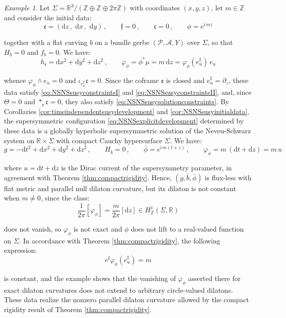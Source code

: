\documentclass[10pt,reqno,a4paper]{amsart}
\theoremstyle{plain}
\theoremstyle{definition}
\theoremstyle{remark}
\theoremstyle{remark}
\newtheorem{ep}[thm]{Example}
\def\dd{\mathrm{d}}
\def\cA{\mathcal{A}}
\def\cP{\mathcal{P}}
\def\frc{\mathfrak{c}}
\def\fre{\mathfrak{e}}
\renewcommand{\(}{ (}
\renewcommand{\)}{ )}
\newcommand{\frf}{\mathfrak{f}}
\begin{document}
\begin{ep}
\label{ep:compactnontrivialdilaton}
Let $\Sigma = \mathbb{R}^3/(\mathbb{Z}\oplus\mathbb{Z}\oplus 2\pi\mathbb{Z})$ with coordinates $(x,y,z)$, let $m\in\mathbb{Z}$ and consider the initial data:
\begin{equation*}
\fre = (\dd z\, , \,\, \dd x\, , \,\, \dd y)\, , \qquad \frf = 0\, , \qquad \frc = 0\, , \qquad \phi = e^{\mathrm{i}\, m z}
\end{equation*}

\noindent
together with a flat curving $b$ on a bundle gerbe $(\cP,\cA,Y)$ over $\Sigma$, so that $H_b = 0$ and $f_b = 0$. We have:
\begin{equation*}
 h_{\fre} = \dd x^2 + \dd y^2 + \dd z^2\, , \qquad  \varphi_{\phi} = \phi^{\ast}\mu = m\, \dd z = \varphi_{\phi}(e^{\sharp}_u)\, e_u  
\end{equation*}

\noindent
whence $\varphi_{\phi}\wedge e_u = 0$ and $\iota_{e^{\sharp}_u}\frc = 0$. Since the coframe $\fre$ is closed and $e^{\sharp}_u = \partial_z$, these data satisfy \eqref{eq:NSNSsusyconstraintsI} and \eqref{eq:NSNSsusyconstraintsII}, and, since $\Theta = 0$ and $\ast_{\fre}\frc = 0$, they also satisfy \eqref{eq:NSNSsusysolutionconstraints}. By Corollaries \ref{cor:timeindependentsusydevelopment} and \ref{cor:NSNSsusyinitialdata}, the supersymmetric configuration \eqref{eq:NSNSexplicitdevelopment} determined by these data is a globally hyperbolic supersymmetric solution of the Neveu-Schwarz system on $\mathbb{R}\times\Sigma$ with compact Cauchy hypersurface $\Sigma$. We have:
\begin{equation*}
g = -\dd t^2 + \dd x^2 + \dd y^2 + \dd z^2\, , \qquad H_{\bar{b}} = 0\, , \qquad \bar{\phi} = e^{\mathrm{i}\, m (t + z)}\, , \qquad \varphi_{\bar{\phi}} = m\, (\dd t + \dd z) = m\, u
\end{equation*}

\noindent
where $u = \dd t + \dd z$ is the Dirac current of the supersymmetry parameter, in agreement with Theorem \ref{thm:compactrigidity}. Hence, $(g,\bar{b},\bar{\phi})$ is flux-less with flat metric and parallel null dilaton curvature, but its dilaton is not constant when $m\neq 0$, since the class:
\begin{equation*}
\frac{1}{2\pi}[\varphi_{\phi}] = \frac{m}{2\pi}[\dd z]\in H^1_{\mathbb{Z}}(\Sigma,\mathbb{R})   
\end{equation*}

\noindent
does not vanish, so $\varphi_{\phi}$ is not exact and $\phi$ does not lift to a real-valued function on $\Sigma$. In accordance with Theorem \ref{thm:compactrigidity}, the following expression:
\begin{equation*}
e^{\frf}\varphi_{\phi}(e^{\sharp}_u) = m    
\end{equation*}

\noindent
is constant, and the example shows that the vanishing of $\varphi_{\phi}$ asserted there for exact dilaton curvatures does not extend to arbitrary circle-valued dilatons. These data realize the nonzero parallel dilaton curvature allowed by the compact rigidity result of Theorem \ref{thm:compactrigidity}.
\end{ep}
  
\end{document}
